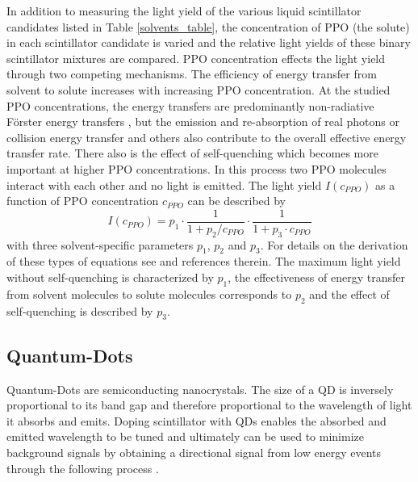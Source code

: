 \documentclass{JINST}
\begin{document}
 
In addition to measuring the light yield of the various liquid scintillator candidates listed in Table \ref{solvents_table}, the concentration of PPO (the solute) in each scintillator candidate is varied and the relative light yields of these binary scintillator mixtures are compared. PPO concentration effects the light yield through two competing mechanisms. The efficiency of energy transfer from solvent to solute increases with increasing PPO concentration. At the studied PPO concentrations, the energy transfers are predominantly non-radiative F\"orster energy transfers \cite{foerster48,foerster59}, but the emission and re-absorption of real photons or collision energy transfer and others \cite{dexter53} also contribute to the overall effective energy transfer rate. There also is the effect of self-quenching \cite{birks64} which becomes more important at higher PPO concentrations. In this process two PPO molecules interact with each other and no light is emitted. The light yield $I(c_{PPO})$ as a function of PPO concentration $c_{PPO}$ can be described by 
\begin{equation}
\label{fit_eq}
I(c_{PPO})=p_1 \cdot \frac{1}{1+p_2/c_{PPO}} \cdot \frac{1}{1+p_3\cdot c_{PPO}}
\end{equation} 
with three solvent-specific parameters $p_1$, $p_2$ and $p_3$. For details on the derivation of these types of equations see \cite{buck07,aberle11} and references therein. The maximum light yield without self-quenching is characterized by $p_1$, the effectiveness of energy transfer from solvent molecules to solute molecules corresponds to $p_2$ and the effect of self-quenching is described by $p_3$.

\subsection{Quantum-Dots}\label{qd_sec}
Quantum-Dots are semiconducting nanocrystals. The size of a QD is inversely proportional to its band gap and therefore proportional to the wavelength of light it absorbs and emits. Doping scintillator with QDs enables the absorbed and emitted wavelength to be tuned and ultimately can be used to minimize background signals by obtaining a directional signal from low energy events through the following process \cite{lindley14}.
\end{document}
